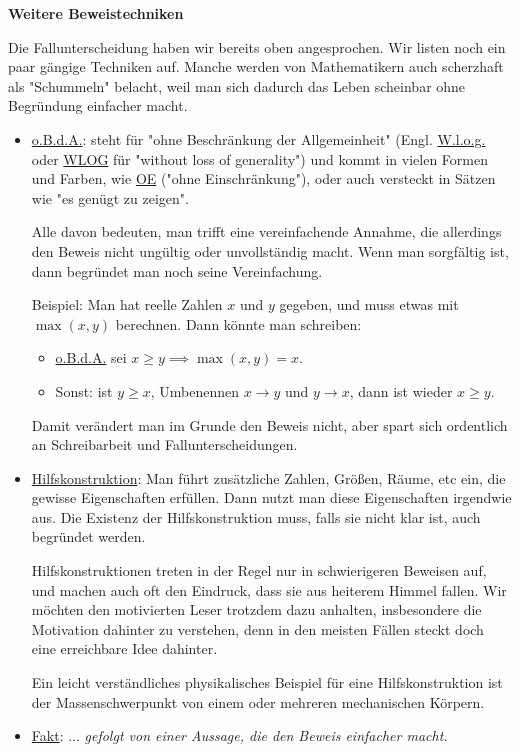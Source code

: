\begin{shadedbox}
    \label{obda-fakt}
    \textbf{Weitere Beweistechniken}

    Die Fallunterscheidung haben wir bereits oben angesprochen. Wir listen noch ein paar gängige Techniken auf. Manche werden von Mathematikern auch scherzhaft als "Schummeln" belacht, weil man sich dadurch das Leben scheinbar ohne Begründung einfacher macht.

    \begin{itemize}
        \item \uline{o.B.d.A.}: steht für "ohne Beschränkung der Allgemeinheit" (Engl. \uline{W.l.o.g.} oder \uline{WLOG} für "without loss of generality") und kommt in vielen Formen und Farben, wie \uline{OE} ("ohne Einschränkung"), oder auch versteckt in Sätzen wie "es genügt zu zeigen".
        
        Alle davon bedeuten, man trifft eine vereinfachende Annahme, die allerdings den Beweis nicht ungültig oder unvollständig macht. Wenn man sorgfältig ist, dann begründet man noch seine Vereinfachung.
        
        Beispiel: Man hat reelle Zahlen $x$ und $y$ gegeben, und muss etwas mit $\max(x, y)$ berechnen. Dann könnte man schreiben:
        \begin{itemize}[label=]
            \item \uline{o.B.d.A.} sei $x \geq y \implies \max(x, y) = x$.
            \item Sonst: ist $y \geq x$, Umbenennen $x \rightarrow y$ und $y \rightarrow x$, dann ist wieder $x \geq y$.
        \end{itemize}
        Damit verändert man im Grunde den Beweis nicht, aber spart sich ordentlich an Schreibarbeit und Fallunterscheidungen.
        \item \uline{Hilfskonstruktion}: Man führt zusätzliche Zahlen, Größen, Räume, etc ein, die gewisse Eigenschaften erfüllen. Dann nutzt man diese Eigenschaften irgendwie aus. Die Existenz der Hilfskonstruktion muss, falls sie nicht klar ist, auch begründet werden.
        
        Hilfskonstruktionen treten in der Regel nur in schwierigeren Beweisen auf, und machen auch oft den Eindruck, dass sie aus heiterem Himmel fallen. Wir möchten den motivierten Leser trotzdem dazu anhalten, insbesondere die Motivation dahinter zu verstehen, denn in den meisten Fällen steckt doch eine erreichbare Idee dahinter.
        
        Ein leicht verständliches physikalisches Beispiel für eine Hilfskonstruktion ist der Massenschwerpunkt von einem oder mehreren mechanischen Körpern.
        \item \uline{Fakt}: ... \emph{gefolgt von einer Aussage, die den Beweis einfacher macht.}


\end{itemize}
\end{shadedbox}
